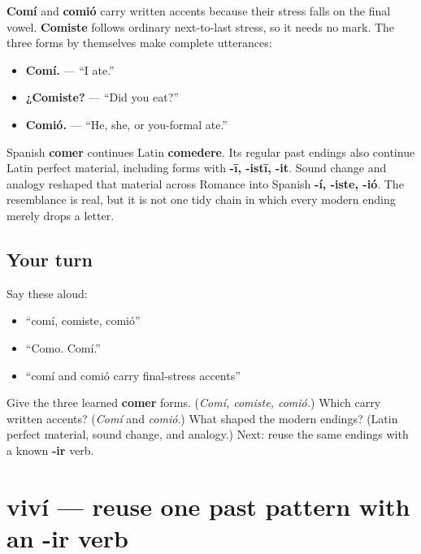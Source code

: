 \begin{grammarlens}[title={Grammar Lens: final stress in two forms}]
\textbf{Comí} and \textbf{comió} carry written accents because their stress falls on the final vowel. \textbf{Comiste} follows ordinary next-to-last stress, so it needs no mark. The three forms by themselves make complete utterances:

\begin{itemize}
\raggedright
  \item \textbf{Comí.} — “I ate.”
  \item \textbf{¿Comiste?} — “Did you eat?”
  \item \textbf{Comió.} — “He, she, or you-formal ate.”
\end{itemize}
\end{grammarlens}

\begin{cousinweb}
Spanish \textbf{comer} continues Latin \textbf{comedere}. Its regular past endings also continue Latin perfect material, including forms with \textbf{-ī, -istī, -it}. Sound change and analogy reshaped that material across Romance into Spanish \textbf{-í, -iste, -ió}. The resemblance is real, but it is not one tidy chain in which every modern ending merely drops a letter.
\end{cousinweb}

\subsection*{Your turn}
Say these aloud:

\begin{itemize}
\raggedright
  \item “comí, comiste, comió”
  \item “Como. Comí.”
  \item “comí and comió carry final-stress accents”
\end{itemize}

\begin{tcolorbox}[breakable,colback=teal!4,colframe=teal!35!black,title={Before you move on}]
Give the three learned \textbf{comer} forms. (\emph{Comí, comiste, comió.}) Which carry written accents? (\emph{Comí} and \emph{comió}.) What shaped the modern endings? (Latin perfect material, sound change, and analogy.) Next: reuse the same endings with a known \textbf{-ir} verb.
\end{tcolorbox}
\section[viví]{viví — reuse one past pattern with an -ir verb}

